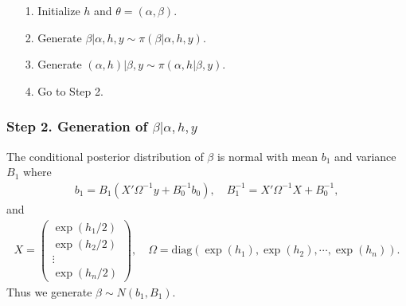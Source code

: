 \begin{itemize}
    \item[1.] Initialize $h$ and $\theta=(\alpha,\beta)$.
    \item[2.] Generate $\beta|\alpha,h, y \sim \pi(\beta|\alpha,h, y)$.
    \item[3.] Generate $(\alpha,h)|\beta, y \sim \pi(\alpha,h|\beta, y)$.
    \item[4.] Go to Step 2.
\end{itemize}
\subsubsection*{Step 2. Generation of $\beta|\alpha,h,y$}
The conditional posterior distribution of $\beta$ is normal with mean $b_1$ and variance $B_1$ where
\begin{eqnarray*}
b_1 = B_1 \left(X'\Omega^{-1}y + B_0^{-1}b_0\right), \quad 
B_1^{-1} = X'\Omega^{-1}X + B_0^{-1},
\end{eqnarray*}
and
\begin{eqnarray*}
X = \left(\begin{array}{c}  \exp(h_1/2) \\  \exp(h_2/2) \\ \vdots  \\  \exp(h_n/2)  \end{array}  \right),
\quad
\Omega = \mbox{diag}\left(\exp(h_1),\exp(h_2),\cdots, \exp(h_n)\right).
\end{eqnarray*}
Thus we generate $\beta \sim N(b_1,B_1).$
